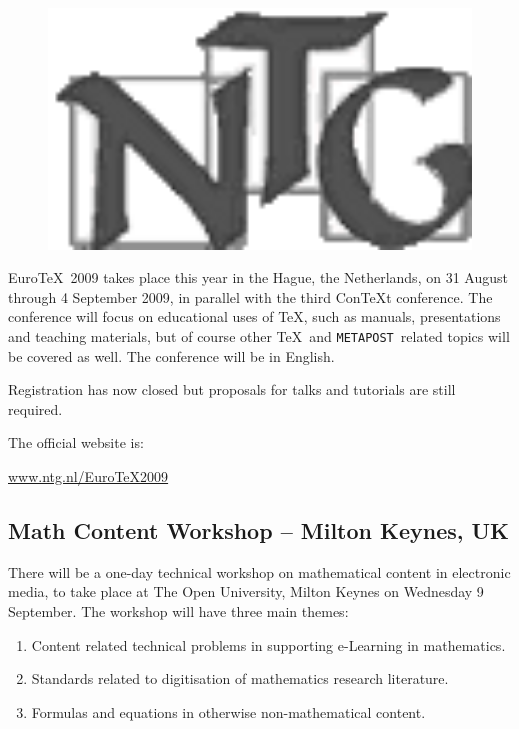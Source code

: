 \documentclass[a4paper,twoside,twocolumn]{article}
\newcommand{\MP}{\texttt{META}\-\texttt{POST}}
\begin{document}
\begin{figure}
    \vspace{-10pt}
    \includegraphics[width=1.0\textwidth]{ntglogo_bw3.png}
    \vspace{-10pt}
\end{figure}

Euro\TeX\ 2009 takes place this year in the Hague, the Netherlands, on 31 August through 4 September 2009, in parallel with the third Con\TeX t conference. The conference will focus on educational uses of \TeX, such as manuals,  presentations and teaching materials, but of course other \TeX\ and \MP\ related topics will be covered as well.  The conference will be in English.

Registration has now closed but proposals for talks and tutorials are still required.

The official website is:
\begin{center}
 \href{http://www.ntg.nl/EuroTeX2009/index.html}{www.ntg.nl/EuroTeX2009}
\end{center}

\subsection{Math Content Workshop -- Milton Keynes, UK}
There will be a one-day technical workshop on mathematical content in electronic media, to take place at The Open University, Milton Keynes on Wednesday 9 September. The workshop will have three main themes:
\begin{enumerate}
	\item Content related technical problems in supporting e-Learning in mathematics.
	\item Standards related to digitisation of mathematics research literature.
	\item Formulas and equations in otherwise non-mathematical content.
\end{enumerate}
\end{document}
